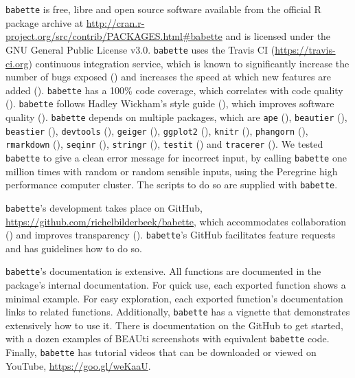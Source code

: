 \documentclass{article}
\begin{document}
\verb;babette; is free, libre and open source software available 
from the official R package archive at 
\url{http://cran.r-project.org/src/contrib/PACKAGES.html\#babette}
and is licensed under the GNU General Public License v3.0.
\verb;babette; uses the Travis CI (\url{https://travis-ci.org})
continuous integration service, which is known to significantly 
increase the number of bugs exposed (\cite{vasilescu2015}) and increases
the speed at which new features are added (\cite{vasilescu2015}).
\verb;babette; has a 100\% code coverage, which correlates with 
code quality (\cite{horgan1994,del1995correlation}). 
\verb;babette; follows Hadley Wickham's style guide (\cite{style_guide}), 
which improves software quality (\cite{fang2001}).
\verb;babette; depends on multiple packages, which are 
\verb;ape; (\cite{APE}), 
\verb;beautier; (\cite{beautier}),
\verb;beastier; (\cite{beastier}),
\verb;devtools; (\cite{devtools}),
\verb;geiger; (\cite{GEIGER}),
\verb;ggplot2; (\cite{ggplot2}),
\verb;knitr; (\cite{knitr}),
\verb;phangorn; (\cite{phangorn}),
\verb;rmarkdown; (\cite{rmarkdown}),
\verb;seqinr; (\cite{seqinr}),
\verb;stringr; (\cite{stringr}),
\verb;testit; (\cite{testit}) and 
\verb;tracerer; (\cite{tracerer}).
We tested \verb;babette; to give a clean 
error message for incorrect input, by
calling \verb;babette; one million times
with random or random sensible inputs, 
using the Peregrine high performance computer cluster. 
The scripts to do so are supplied with \verb;babette;.

\verb;babette;'s development takes place on GitHub,
\url{https://github.com/richelbilderbeek/babette}, 
which accommodates collaboration (\cite{perez2016ten}) 
and improves transparency (\cite{gorgolewski2016practical}).
\verb;babette;'s GitHub facilitates feature requests and 
has guidelines how to do so.

\verb;babette;'s documentation is extensive. All functions are documented
in the package's internal documentation. For quick use, 
each exported function shows a minimal example. 
For easy exploration, each exported function's documentation links to related functions.
Additionally, \verb;babette; has a vignette that demonstrates extensively how
to use it. There is documentation on the GitHub to get started, 
with a dozen examples of BEAUti screenshots with equivalent \verb;babette; code.
Finally, \verb;babette; has tutorial videos that can 
be downloaded or viewed on YouTube, \url{https://goo.gl/weKaaU}.

\end{document}
